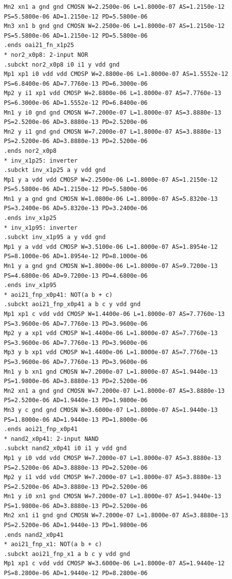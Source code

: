 \documentclass[10pt,a4paper]{article}
\begin{document}
{\begin{verbatim}
Mn2 xn1 a gnd gnd CMOSN W=2.2500e-06 L=1.8000e-07 AS=1.2150e-12 PS=5.5800e-06 AD=1.2150e-12 PD=5.5800e-06
Mn3 xn1 b gnd gnd CMOSN W=2.2500e-06 L=1.8000e-07 AS=1.2150e-12 PS=5.5800e-06 AD=1.2150e-12 PD=5.5800e-06
.ends oai21_fn_x1p25
* nor2_x0p8: 2-input NOR
.subckt nor2_x0p8 i0 i1 y vdd gnd
Mp1 xp1 i0 vdd vdd CMOSP W=2.8800e-06 L=1.8000e-07 AS=1.5552e-12 PS=6.8400e-06 AD=7.7760e-13 PD=6.3000e-06
Mp2 y i1 xp1 vdd CMOSP W=2.8800e-06 L=1.8000e-07 AS=7.7760e-13 PS=6.3000e-06 AD=1.5552e-12 PD=6.8400e-06
Mn1 y i0 gnd gnd CMOSN W=7.2000e-07 L=1.8000e-07 AS=3.8880e-13 PS=2.5200e-06 AD=3.8880e-13 PD=2.5200e-06
Mn2 y i1 gnd gnd CMOSN W=7.2000e-07 L=1.8000e-07 AS=3.8880e-13 PS=2.5200e-06 AD=3.8880e-13 PD=2.5200e-06
.ends nor2_x0p8
* inv_x1p25: inverter
.subckt inv_x1p25 a y vdd gnd
Mp1 y a vdd vdd CMOSP W=2.2500e-06 L=1.8000e-07 AS=1.2150e-12 PS=5.5800e-06 AD=1.2150e-12 PD=5.5800e-06
Mn1 y a gnd gnd CMOSN W=1.0800e-06 L=1.8000e-07 AS=5.8320e-13 PS=3.2400e-06 AD=5.8320e-13 PD=3.2400e-06
.ends inv_x1p25
* inv_x1p95: inverter
.subckt inv_x1p95 a y vdd gnd
Mp1 y a vdd vdd CMOSP W=3.5100e-06 L=1.8000e-07 AS=1.8954e-12 PS=8.1000e-06 AD=1.8954e-12 PD=8.1000e-06
Mn1 y a gnd gnd CMOSN W=1.8000e-06 L=1.8000e-07 AS=9.7200e-13 PS=4.6800e-06 AD=9.7200e-13 PD=4.6800e-06
.ends inv_x1p95
* aoi21_fnp_x0p41: NOT(a b + c)
.subckt aoi21_fnp_x0p41 a b c y vdd gnd
Mp1 xp1 c vdd vdd CMOSP W=1.4400e-06 L=1.8000e-07 AS=7.7760e-13 PS=3.9600e-06 AD=7.7760e-13 PD=3.9600e-06
Mp2 y a xp1 vdd CMOSP W=1.4400e-06 L=1.8000e-07 AS=7.7760e-13 PS=3.9600e-06 AD=7.7760e-13 PD=3.9600e-06
Mp3 y b xp1 vdd CMOSP W=1.4400e-06 L=1.8000e-07 AS=7.7760e-13 PS=3.9600e-06 AD=7.7760e-13 PD=3.9600e-06
Mn1 y b xn1 gnd CMOSN W=7.2000e-07 L=1.8000e-07 AS=1.9440e-13 PS=1.9800e-06 AD=3.8880e-13 PD=2.5200e-06
Mn2 xn1 a gnd gnd CMOSN W=7.2000e-07 L=1.8000e-07 AS=3.8880e-13 PS=2.5200e-06 AD=1.9440e-13 PD=1.9800e-06
Mn3 y c gnd gnd CMOSN W=3.6000e-07 L=1.8000e-07 AS=1.9440e-13 PS=1.8000e-06 AD=1.9440e-13 PD=1.8000e-06
.ends aoi21_fnp_x0p41
* nand2_x0p41: 2-input NAND
.subckt nand2_x0p41 i0 i1 y vdd gnd
Mp1 y i0 vdd vdd CMOSP W=7.2000e-07 L=1.8000e-07 AS=3.8880e-13 PS=2.5200e-06 AD=3.8880e-13 PD=2.5200e-06
Mp2 y i1 vdd vdd CMOSP W=7.2000e-07 L=1.8000e-07 AS=3.8880e-13 PS=2.5200e-06 AD=3.8880e-13 PD=2.5200e-06
Mn1 y i0 xn1 gnd CMOSN W=7.2000e-07 L=1.8000e-07 AS=1.9440e-13 PS=1.9800e-06 AD=3.8880e-13 PD=2.5200e-06
Mn2 xn1 i1 gnd gnd CMOSN W=7.2000e-07 L=1.8000e-07 AS=3.8880e-13 PS=2.5200e-06 AD=1.9440e-13 PD=1.9800e-06
.ends nand2_x0p41
* aoi21_fnp_x1: NOT(a b + c)
.subckt aoi21_fnp_x1 a b c y vdd gnd
Mp1 xp1 c vdd vdd CMOSP W=3.6000e-06 L=1.8000e-07 AS=1.9440e-12 PS=8.2800e-06 AD=1.9440e-12 PD=8.2800e-06

\end{verbatim}}
\end{document}
